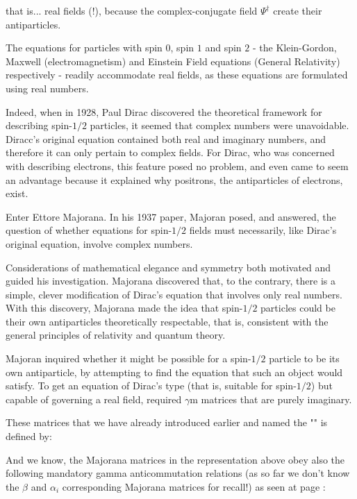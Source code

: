 	that is... real fields (!), because the complex-conjugate field $\Psi^\dagger$ create their antiparticles. 
	
	The equations for particles with spin $0$, spin $1$ and spin $2$ - the Klein-Gordon, Maxwell (electromagnetism) and Einstein Field equations (General Relativity) respectively - readily accommodate real fields, as these equations are formulated using real numbers.
	
	Indeed, when in 1928, Paul Dirac discovered the theoretical framework for describing spin-$1/2$ particles, it seemed that complex numbers were unavoidable. Diracc's original equation contained both real and imaginary numbers, and therefore it can only pertain to complex fields. For Dirac, who was concerned with describing  electrons, this feature posed no problem, and even came to seem an advantage because it explained why positrons, the antiparticles of electrons, exist.
	
	Enter Ettore Majorana. In his 1937 paper, Majoran posed, and answered, the question of whether equations for spin-$1/2$ fields must necessarily, like Dirac's original equation, involve complex numbers.
	
	Considerations of mathematical elegance and symmetry both motivated and guided his investigation. Majorana discovered that, to the contrary, there is a simple, clever modification of Dirac's equation that involves only real numbers. With this discovery, Majorana made the idea that spin-$1/2$ particles could be their own antiparticles theoretically respectable, that is, consistent with the general principles of relativity and quantum theory.
	
	Majoran inquired whether it might be possible for a spin-$1/2$ particle to be its own antiparticle, by attempting to find the equation that such an object would satisfy. To get an equation of Dirac's type (that is, suitable for spin-$1/2$) but capable of governing a real field, required $\gamma$m matrices that are purely imaginary.
	
	These matrices that we have already introduced earlier and named the "" is defined by:
	
	And we know, the Majorana matrices in the representation above obey also the following mandatory gamma anticommutation relations (as so far we don't know the $\beta$ and $\alpha_i$ corresponding Majorana matrices for recall!) as seen at page \pageref{gamma anticommutation relations}:
	
